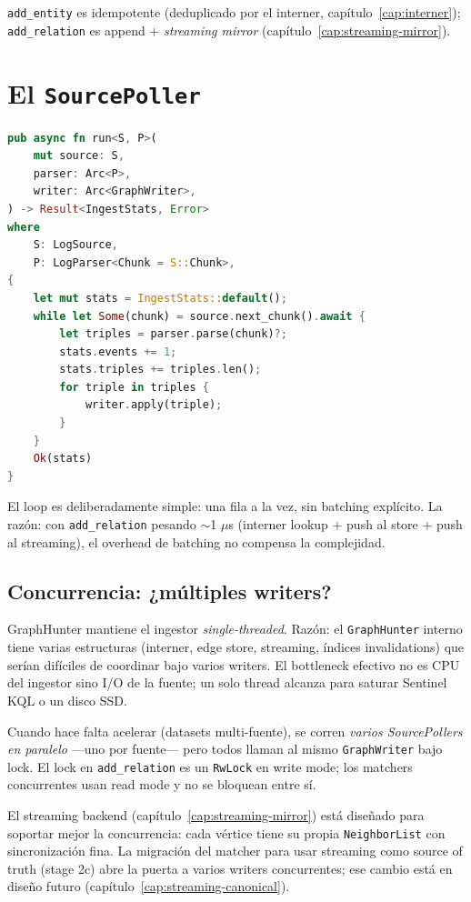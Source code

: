 \noindent
\texttt{add\_entity} es idempotente (deduplicado por el interner,
capítulo~\ref{cap:interner}); \texttt{add\_relation} es append +
\emph{streaming mirror} (capítulo~\ref{cap:streaming-mirror}).

\section{El \texttt{SourcePoller}}

\begin{lstlisting}[language=Rust]
pub async fn run<S, P>(
    mut source: S,
    parser: Arc<P>,
    writer: Arc<GraphWriter>,
) -> Result<IngestStats, Error>
where
    S: LogSource,
    P: LogParser<Chunk = S::Chunk>,
{
    let mut stats = IngestStats::default();
    while let Some(chunk) = source.next_chunk().await {
        let triples = parser.parse(chunk)?;
        stats.events += 1;
        stats.triples += triples.len();
        for triple in triples {
            writer.apply(triple);
        }
    }
    Ok(stats)
}
\end{lstlisting}

\noindent
El loop es deliberadamente simple: una fila a la vez, sin batching
explícito. La razón: con \texttt{add\_relation} pesando $\sim$1
$\mu$s (interner lookup + push al store + push al streaming), el
overhead de batching no compensa la complejidad.

\subsection{Concurrencia: ¿múltiples writers?}

GraphHunter mantiene el ingestor \emph{single-threaded}. Razón: el
\texttt{GraphHunter} interno tiene varias estructuras (interner,
edge store, streaming, índices invalidations) que serían difíciles
de coordinar bajo varios writers. El bottleneck efectivo no es CPU
del ingestor sino I/O de la fuente; un solo thread alcanza para
saturar Sentinel KQL o un disco SSD.

Cuando hace falta acelerar (datasets multi-fuente), se corren
\emph{varios SourcePollers en paralelo} ---uno por fuente--- pero
todos llaman al mismo \texttt{GraphWriter} bajo lock. El lock en
\texttt{add\_relation} es un \texttt{RwLock} en write mode; los
matchers concurrentes usan read mode y no se bloquean entre sí.

\begin{nota}
El streaming backend (capítulo~\ref{cap:streaming-mirror}) está
diseñado para soportar mejor la concurrencia: cada vértice tiene su
propia \texttt{NeighborList} con sincronización fina. La migración
del matcher para usar streaming como source of truth (stage 2c) abre
la puerta a varios writers concurrentes; ese cambio está en
diseño futuro (capítulo~\ref{cap:streaming-canonical}).
\end{nota}

